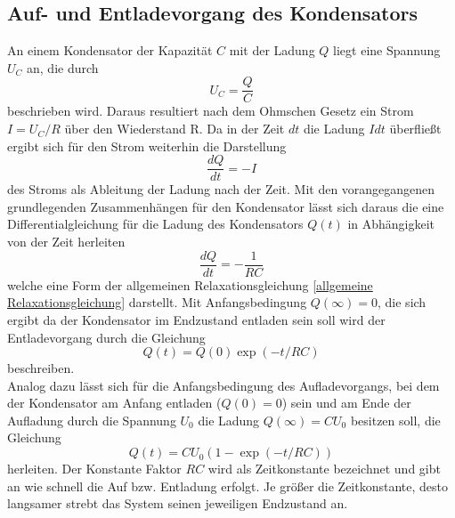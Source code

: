 \subsection{Auf- und Entladevorgang des Kondensators}
An einem Kondensator der Kapazität $C$ mit der Ladung $Q$ liegt eine Spannung $U_C$ an, die durch
\begin{equation*}
U_C=\frac{Q}{C}
\end{equation*}
beschrieben wird. Daraus resultiert nach dem Ohmschen Gesetz ein Strom $I=U_C/R$ über den Wiederstand R. Da in der Zeit $dt$ die Ladung 
$Idt$ überfließt ergibt sich für den Strom weiterhin die Darstellung
\begin{equation*}
\frac{dQ}{dt}=-I
\end{equation*}
des Stroms als Ableitung der Ladung nach der Zeit. Mit den vorangegangenen grundlegenden Zusammenhängen für den Kondensator lässt sich daraus die 
eine Differentialgleichung für die Ladung des Kondensators $Q(t)$ in Abhängigkeit von der Zeit herleiten
\begin{equation}
\frac{dQ}{dt}=-\frac{1}{RC}
\end{equation}
welche eine Form der allgemeinen Relaxationsgleichung \ref{allgemeine Relaxationsgleichung} darstellt. Mit Anfangsbedingung $Q(\infty)=0$, die sich ergibt da der 
Kondensator im Endzustand entladen sein soll wird der Entladevorgang durch die Gleichung
\begin{equation}
Q(t)=Q(0)\exp (-t/RC)
\end{equation}
beschreiben. \\
Analog dazu lässt sich für die Anfangsbedingung des Aufladevorgangs, bei dem der Kondensator am Anfang entladen ($Q(0)=0$) sein und am Ende der Aufladung durch die
Spannung $U_0$ die Ladung $Q(\infty)=CU_0$ besitzen soll, die Gleichung 
\begin{equation}
Q(t)=CU_0(1-\exp(-t/RC))
\end{equation}
herleiten. Der Konstante Faktor $RC$ wird als Zeitkonstante bezeichnet und gibt an wie schnell die Auf bzw. Entladung erfolgt. Je größer die Zeitkonstante,
desto langsamer strebt das System seinen jeweiligen Endzustand an.
